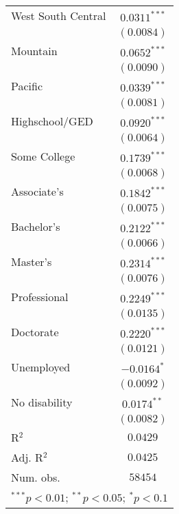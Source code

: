 \documentclass{article}
\begin{document}
\begin{table}
\begin{center}
\begin{tabular}{l c}
West South Central             & $0.0311^{***}$  \\
                               & $(0.0084)$      \\
Mountain                       & $0.0652^{***}$  \\
                               & $(0.0090)$      \\
Pacific                        & $0.0339^{***}$  \\
                               & $(0.0081)$      \\
Highschool/GED                 & $0.0920^{***}$  \\
                               & $(0.0064)$      \\
Some College                   & $0.1739^{***}$  \\
                               & $(0.0068)$      \\
Associate's                    & $0.1842^{***}$  \\
                               & $(0.0075)$      \\
Bachelor's                     & $0.2122^{***}$  \\
                               & $(0.0066)$      \\
Master's                       & $0.2314^{***}$  \\
                               & $(0.0076)$      \\
Professional                   & $0.2249^{***}$  \\
                               & $(0.0135)$      \\
Doctorate                      & $0.2220^{***}$  \\
                               & $(0.0121)$      \\
Unemployed                     & $-0.0164^{*}$   \\
                               & $(0.0092)$      \\
No disability                  & $0.0174^{**}$   \\
                               & $(0.0082)$      \\
\hline
R$^2$                          & $0.0429$        \\
Adj. R$^2$                     & $0.0425$        \\
Num. obs.                      & $58454$         \\
\hline
\multicolumn{2}{l}{\scriptsize{$^{***}p<0.01$; $^{**}p<0.05$; $^{*}p<0.1$}}
\end{tabular}
\caption{}
\label{}
\end{center}
\end{table}
\end{document}
